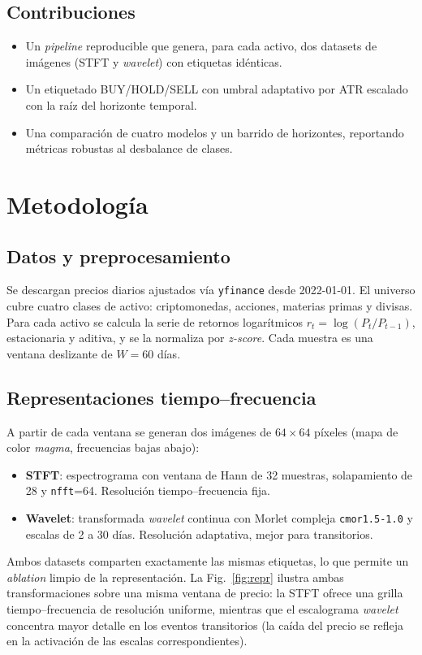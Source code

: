 \documentclass[conference]{IEEEtran}
\begin{document}
\subsection{Contribuciones}
\begin{itemize}
  \item Un \emph{pipeline} reproducible que genera, para cada activo, dos
        datasets de imágenes (STFT y \emph{wavelet}) con etiquetas idénticas.
  \item Un etiquetado BUY/HOLD/SELL con umbral adaptativo por ATR escalado
        con la raíz del horizonte temporal.
  \item Una comparación de cuatro modelos y un barrido de horizontes,
        reportando métricas robustas al desbalance de clases.
\end{itemize}

\section{Metodología}

\subsection{Datos y preprocesamiento}
Se descargan precios diarios ajustados vía \texttt{yfinance} desde
2022-01-01. El universo cubre cuatro clases de activo: criptomonedas,
acciones, materias primas y divisas. Para cada activo se calcula la serie de
retornos logarítmicos $r_t = \log(P_t / P_{t-1})$, estacionaria y aditiva,
y se la normaliza por \emph{z-score}. Cada muestra es una ventana deslizante
de $W=60$ días.

\subsection{Representaciones tiempo--frecuencia}
A partir de cada ventana se generan dos imágenes de $64\times64$ píxeles
(mapa de color \emph{magma}, frecuencias bajas abajo):
\begin{itemize}
  \item \textbf{STFT}: espectrograma con ventana de Hann de 32 muestras,
        solapamiento de 28 y \texttt{nfft}=64. Resolución
        tiempo--frecuencia fija.
  \item \textbf{Wavelet}: transformada \emph{wavelet} continua con Morlet
        compleja \texttt{cmor1.5-1.0} y escalas de 2 a 30 días. Resolución
        adaptativa, mejor para transitorios.
\end{itemize}
Ambos datasets comparten exactamente las mismas etiquetas, lo que permite un
\emph{ablation} limpio de la representación. La Fig.~\ref{fig:repr} ilustra
ambas transformaciones sobre una misma ventana de precio: la STFT ofrece una
grilla tiempo--frecuencia de resolución uniforme, mientras que el escalograma
\emph{wavelet} concentra mayor detalle en los eventos transitorios (la caída
del precio se refleja en la activación de las escalas correspondientes).
\end{document}
